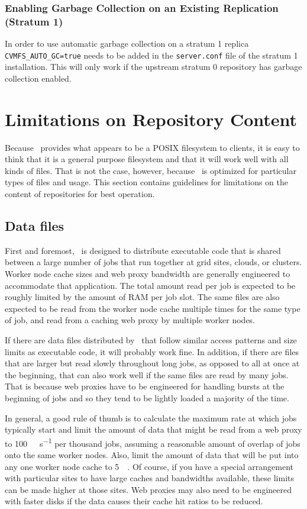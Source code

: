 \subsubsection{Enabling Garbage Collection on an Existing Replication (Stratum 1)}
In order to use automatic garbage collection on a stratum 1 replica \texttt{CVMFS\_AUTO\_GC=true} needs to be added in the \texttt{server.conf} file of the stratum 1 installation.
This will only work if the upstream stratum 0 repository has garbage collection enabled.

\section{Limitations on Repository Content}
Because \cvmfs\ provides what appears to be a POSIX filesystem to clients, it is easy to think that it is a general purpose filesystem and that it will work well with all kinds of files.
That is not the case, however, because \cvmfs\ is optimized for particular types of files and usage.
This section contains guidelines for limitations on the content of repositories for best operation.

\subsection{Data files}
First and foremost, \cvmfs\ is designed to distribute executable code that is shared between a large number of jobs that run together at grid sites, clouds, or clusters.
Worker node cache sizes and web proxy bandwidth are generally engineered to accommodate that application.
The total amount read per job is expected to be roughly limited by the amount of RAM per job slot.
The same files are also expected to be read from the worker node cache multiple times for the same type of job, and read from a caching web proxy by multiple worker nodes.

If there are data files distributed by \cvmfs\ that follow similar access patterns and size limits as executable code, it will probably work fine.
In addition, if there are files that are larger but read slowly throughout long jobs, as opposed to all at once at the beginning, that can also work well if the same files are read by many jobs.
That is because web proxies have to be engineered for handling bursts at the beginning of jobs and so they tend to be lightly loaded a majority of the time.

In general, a good rule of thumb is to calculate the maximum rate at which jobs typically start and limit the amount of data that might be read from a web proxy to \SI{100}{\mega\byte\per\second} per thousand jobs, assuming a reasonable amount of overlap of jobs onto the same worker nodes.
Also, limit the amount of data that will be put into any one worker node cache to \SI{5}{\giga\byte}.
Of course, if you have a special arrangement with particular sites to have large caches and bandwidths available, these limits can be made higher at those sites.
Web proxies may also need to be engineered with faster disks if the data causes their cache hit ratios to be reduced.

